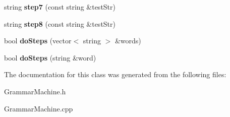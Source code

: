 \begin{DoxyCompactItemize}
\item 
\mbox{\label{class_grammar_machine_a10e0ecf5431facd0008a6a4dea010a82}} 
string {\bfseries step7} (const string \&test\+Str)
\item 
\mbox{\label{class_grammar_machine_a4fd7358adc4a2d99c14dfd522f780a45}} 
string {\bfseries step8} (const string \&test\+Str)
\item 
\mbox{\label{class_grammar_machine_a34ff9196e78c7163f42ce926a20a7161}} 
bool {\bfseries do\+Steps} (vector$<$ string $>$ \&words)
\item 
\mbox{\label{class_grammar_machine_a530ab448fbd5cc2197164cc46c943fdd}} 
bool {\bfseries do\+Steps} (string \&word)
\end{DoxyCompactItemize}


The documentation for this class was generated from the following files\+:\begin{DoxyCompactItemize}
\item 
Grammar\+Machine.\+h\item 
Grammar\+Machine.\+cpp\end{DoxyCompactItemize}
